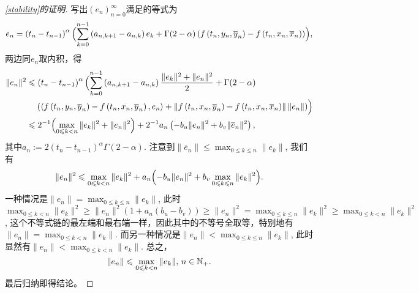 \begin{proof}[\cref{stability}的证明]
    写出$\left(e_n\right)_{n=0}^\infty$满足的等式为
    \begin{equation*}
        e_n=\left(t_n-t_{n-1}\right)^\alpha\Bigl(\sum_{k=0}^{n-1}\left(a_{n,k+1}-a_{n,k}\right)e_k+\Gamma(2-\alpha)\left(f\left(t_n,y_n,\overline y_n\right)-f\left(t_n,x_n,\overline x_n\right)\right)\Bigr),
    \end{equation*}
    两边同$e_n$取内积，得
    \begin{align*}
        \|e_n\|^2&\leqslant\left(t_n-t_{n-1}\right)^\alpha\Bigl(\sum_{k=0}^{n-1}\left(a_{n,k+1}-a_{n,k}\right)\frac{\|e_k\|^2+\|e_n\|^2}{2}+\Gamma(2-\alpha)
        \\& \relphantom{=}\left(\left<f\left(t_n,y_n,\overline y_n\right)-f\left(t_n,x_n,\overline y_n\right),e_n\right>+\left\|f\left(t_n,x_n,\overline y_n\right)-f\left(t_n,x_n,\overline x_n\right)\right\|\left\|e_n\right\|\right)\Bigr)
        \\&\leqslant 2^{-1}\Bigl(\max_{0\leqslant k<n} \|e_k\|^2 + \|e_n\|^2\Bigr)
        +2^{-1}a_n\left(-b_u \|e_n\|^2+b_v \|\overline e_n\|^2\right),
    \end{align*}
    其中$a_n:=2\left(t_n-t_{n-1}\right)^\alpha\Gamma(2-\alpha)$. 注意到$\|\overline e_n\|\leqslant \max_{0\leqslant k\leqslant n} \|e_k\|$, 我们有
    \begin{equation*}
        \|e_n\|^2\leqslant \max_{0\leqslant k<n} \|e_k\|^2+a_n\Bigl(-b_u \|e_n\|^2+b_v \max_{0\leqslant k\leqslant n} \|e_k\|^2\Bigr).
    \end{equation*}
    一种情况是$\|e_n\|=\max_{0\leqslant k\leqslant n} \|e_k\|$, 此时
    $\max_{0\leqslant k<n} \|e_k\|^2 \geqslant \|e_n\|^2 (1+ a_n(b_u-b_v))\geqslant \|e_n\|^2=\max_{0\leqslant k\leqslant n} \|e_k\|^2\geqslant \max_{0\leqslant k<n} \|e_k\|^2$, 这个不等式链的最左端和最右端一样，因此其中的不等号全取等，特别地有$\|e_n\|=\max_{0\leqslant k<n} \|e_k\|$. 而另一种情况是$\|e_n\|<\max_{0\leqslant k\leqslant n} \|e_k\|$, 此时显然有$\|e_n\|<\max_{0\leqslant k< n} \|e_k\|$. 总之，
    \begin{equation*}
        \|e_n\|\leqslant\max_{0\leqslant k< n} \|e_k\|,\,n\in\mathbb{N_+}.
    \end{equation*}
    最后归纳即得结论。
\end{proof}